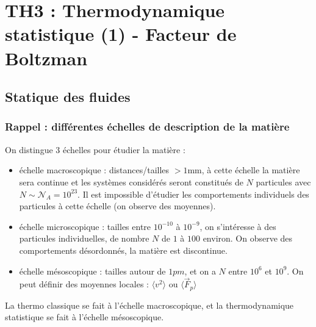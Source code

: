 \documentclass[a4paper,12pt]{book}
\begin{document}
\section{TH3 : Thermodynamique statistique (1) - Facteur de Boltzman}
\subsection{Statique des fluides}
\subsubsection{Rappel : différentes échelles de description de la matière}
On distingue 3 échelles pour étudier la matière :\begin{itemize}
\item échelle macroscopique : distances/tailles $>1$mm, à cette échelle la matière sera continue et les systèmes considérés seront constitués de $N$ particules avec $N\sim \mathcal{N}_A=10^{23}$. Il est impossible d'étudier les comportements individuels des particules à cette échelle (on observe des moyennes).
\item échelle microscopique : tailles entre $10^{-10}$ à $10^{-9}$, on s'intéresse à des particules individuelles, de nombre $N$ de $1$ à $100$ environ. On observe des comportements désordonnés, la matière est discontinue.
\item échelle mésoscopique : tailles autour de $1 pm$, et on a $N$ entre $10^6$ et $10^9$. On peut définir des moyennes locales : $\langle v^2\rangle$ ou $\langle \vec{F}_p\rangle$
\end{itemize}
La thermo classique se fait à l'échelle macroscopique, et la thermodynamique statistique se fait à l'échelle mésoscopique.
\end{document}
